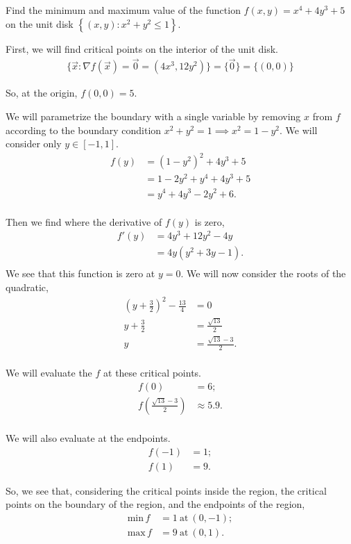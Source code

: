 \documentclass{article}
\begin{document}
  \begin{problem}
    Find the minimum and maximum value of the function $f(x,y)=x^4+4y^3+5$ on the unit disk $\left\{ (x,y):x^2+y^2\le 1 \right\} $.
  \end{problem}

  First, we will find critical points on the interior of the unit disk.
  \begin{align*}
    \{\vec{x}:\nabla f(\vec{x})=\vec{0}=(4x^3,12y^2)\}=\{\vec{0}\}=\{(0,0)\}
  \end{align*}

  So, at the origin, $f(0,0)=5$.

  We will parametrize the boundary with a single variable by removing $x$ from $f$ according to the boundary condition $x^2+y^2=1 \implies x^2=1-y^2$. We will consider only $y \in [-1,1]$.
  \begin{align*}
    f(y)&= {(1-y^2)}^2+4y^3+5 \\
    &= 1-2y^2+y^4+4y^3+5 \\
    &= y^4+4y^3-2y^2+6. \\
  \end{align*}

  Then we find where the derivative of $f(y)$ is zero,
  \begin{align*}
    f'(y)&= 4y^3+12y^2-4y \\
    &= 4y(y^2+3y-1). \\
  \end{align*}
  We see that this function is zero at $y=0$. We will now consider the roots of the quadratic,
  \begin{align*}
    {\left( y+\frac{3}{2} \right) }^2-\frac{13}{4}&= 0 \\
    y+\frac{3}{2}&= \frac{\sqrt{13}}{2}  \\
    y&= \frac{\sqrt{13}-3}{2}. \\
  \end{align*}

  We will evaluate the $f$ at these critical points.
  \begin{align*}
    f(0)&= 6; \\
    f\left( \frac{\sqrt{13}-3}{2} \right) &\approx 5.9. \\
  \end{align*}

  We will also evaluate at the endpoints.
  \begin{align*}
    f(-1)&= 1; \\
    f(1)&= 9.
  \end{align*}

  So, we see that, considering the critical points inside the region, the critical points on the boundary of the region, and the endpoints of the region,
  \begin{align*}
    \text{min}\,f &= 1 \ \text{at}\ (0,-1); \\
    \text{max}\,f &= 9 \ \text{at}\ (0,1). \\
  \end{align*}
\end{document}
